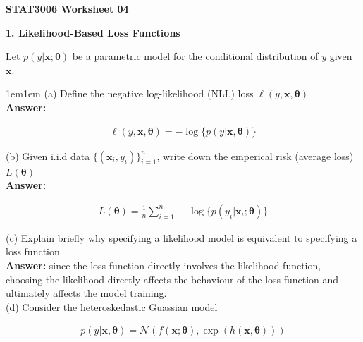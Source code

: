 \documentclass[11pt]{article}
\begin{document}
    \begin{center}
        \Large \textbf{STAT3006 Worksheet 04}
    \end{center}

    \Large \textbf{1. Likelihood-Based Loss Functions}
    
    \large Let $p(y | \mathbf{x}; \boldsymbol{\theta})$ be a parametric model for the conditional
    distribution of $y$ given $\mathbf{x}$. 

    \begin{adjustwidth}{1em}{1em}
        (a) Define the negative log-likelihood (NLL) loss $\ell(y, \mathbf{x}, 
        \boldsymbol{\theta})$ \\ 

        \textbf{Answer:}

        \begin{align*}
            \ell(y, \mathbf{x}, \boldsymbol{\theta}) = -\log \bigg\{p(y | \mathbf{x},
            \boldsymbol{\theta})\bigg\}
        \end{align*}

        (b) Given i.i.d data $\{(\mathbf{x}_i, y_i)\}_{i = 1}^n$, write down the emperical risk
        (average loss) $L(\boldsymbol{\theta})$ \\ 

        \textbf{Answer:}

        \begin{align*}
            L(\boldsymbol{\theta}) = \frac{1}{n} \sum_{i = 1}^n - \log \bigg\{p(y_i | \mathbf{x}_i ; 
            \boldsymbol{\theta})\bigg\}
        \end{align*}

        (c) Explain briefly why specifying a likelihood model is equivalent to specifying a loss
        function \\ 

        \textbf{Answer:} since the loss function directly involves the likelihood function, choosing
        the likelihood directly affects the behaviour of the loss function and ultimately affects
        the model training. \\ 

        (d) Consider the heteroskedastic Guassian model 

        \begin{align*}
            p(y | \mathbf{x}, \boldsymbol{\theta}) = \mathcal{N}(f(\mathbf{x}; \boldsymbol{\theta}),
            \exp(h(\mathbf{x}, \boldsymbol{\theta})))
        \end{align*}


\end{adjustwidth}
\end{document}
